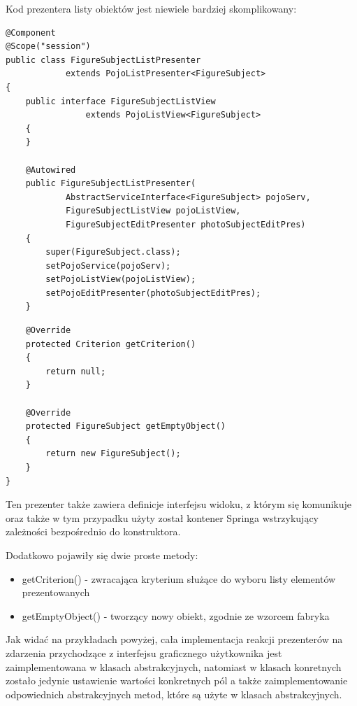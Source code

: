 Kod prezentera listy obiektów jest niewiele bardziej skomplikowany:
\begin{lstlisting}
@Component
@Scope("session")
public class FigureSubjectListPresenter 
			extends PojoListPresenter<FigureSubject>
{
	public interface FigureSubjectListView 
				extends PojoListView<FigureSubject>
	{
	}

	@Autowired
	public FigureSubjectListPresenter(
			AbstractServiceInterface<FigureSubject> pojoServ, 
			FigureSubjectListView pojoListView,
			FigureSubjectEditPresenter photoSubjectEditPres)
	{
		super(FigureSubject.class);
		setPojoService(pojoServ);
		setPojoListView(pojoListView);
		setPojoEditPresenter(photoSubjectEditPres);
	}
\end{lstlisting}
\newpage
\begin{lstlisting}
	@Override
	protected Criterion getCriterion()
	{
		return null;
	}

	@Override
	protected FigureSubject getEmptyObject()
	{
		return new FigureSubject();
	}
}
\end{lstlisting}
Ten prezenter także zawiera definicje interfejsu widoku, z którym się komunikuje oraz także w tym przypadku użyty został kontener Springa wstrzykujący zależności bezpośrednio do konstruktora.

Dodatkowo pojawiły się dwie proste metody:
\begin{itemize}
\item getCriterion() - zwracająca kryterium służące do wyboru listy elementów prezentowanych
\item getEmptyObject() - tworzący nowy obiekt, zgodnie ze wzorcem fabryka
\end{itemize}

Jak widać na przykładach powyżej, cała implementacja reakcji prezenterów na zdarzenia przychodzące z interfejsu graficznego użytkownika jest zaimplementowana w klasach abstrakcyjnych, natomiast w klasach konretnych zostało jedynie ustawienie wartości konkretnych pól a także zaimplementowanie odpowiednich abstrakcyjnych metod, które są użyte w klasach abstrakcyjnych.

